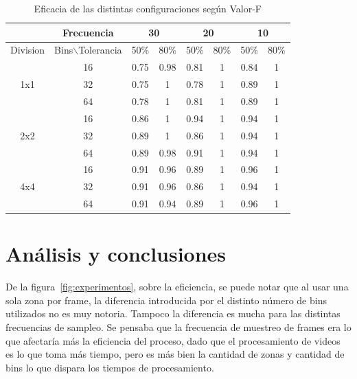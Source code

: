 \documentclass[14pt,letterpaper,hidelinks]{extarticle}
\begin{document}
\begin{table}[ht!]
\centering
\begin{tabular}{c|c|c|c|c|c|c|c|}
\cline{2-8}
 & Frecuencia & \multicolumn{2}{c|}{30} & \multicolumn{2}{c|}{20} & \multicolumn{2}{c|}{10} \\ \hline
\multicolumn{1}{|c|}{Division} & Bins$\backslash$Tolerancia & 50\% & 80\% & 50\% & 80\% & 50\% & 80\% \\ \hline
\multicolumn{1}{|c|}{\multirow{3}{*}{1x1}} & 16 & 0.75 & 0.98 & 0.81 & 1 & 0.84 & 1 \\ \cline{2-8} 
\multicolumn{1}{|c|}{} & 32 & 0.75 & 1 & 0.78 & 1 & 0.89 & 1 \\ \cline{2-8} 
\multicolumn{1}{|c|}{} & 64 & 0.78 & 1 & 0.81 & 1 & 0.89 & 1 \\ \hline
\multicolumn{1}{|c|}{\multirow{3}{*}{2x2}} & 16 & 0.86 & 1 & 0.94 & 1 & 0.94 & 1 \\ \cline{2-8} 
\multicolumn{1}{|c|}{} & 32 & 0.89 & 1 & 0.86 & 1 & 0.94 & 1 \\ \cline{2-8} 
\multicolumn{1}{|c|}{} & 64 & 0.89 & 0.98 & 0.91 & 1 & 0.94 & 1 \\ \hline
\multicolumn{1}{|c|}{\multirow{3}{*}{4x4}} & 16 & 0.91 & 0.96 & 0.89 & 1 & 0.96 & 1 \\ \cline{2-8} 
\multicolumn{1}{|c|}{} & 32 & 0.91 & 0.96 & 0.86 & 1 & 0.94 & 1 \\ \cline{2-8} 
\multicolumn{1}{|c|}{} & 64 & 0.91 & 0.94 & 0.89 & 1 & 0.96 & 1 \\ \hline
\end{tabular}
\captionsetup{justification=centering,margin=2cm}
\caption{Eficacia de las distintas configuraciones según Valor-F\label{tab:eficacia}}
\end{table}

\newpage
\section{Análisis y conclusiones}
De la figura~\ref{fig:experimentos}, sobre la eficiencia, se puede notar que al usar una sola zona por frame, la diferencia introducida por el distinto número de bins utilizados no es muy notoria. Tampoco la diferencia es mucha para las distintas frecuencias de sampleo. Se pensaba que la frecuencia de muestreo de frames era lo que afectaría más la eficiencia del proceso, dado que el procesamiento de videos es lo que toma más tiempo, pero es más bien la cantidad de zonas y cantidad de bins lo que dispara los tiempos de procesamiento.\\
\end{document}
